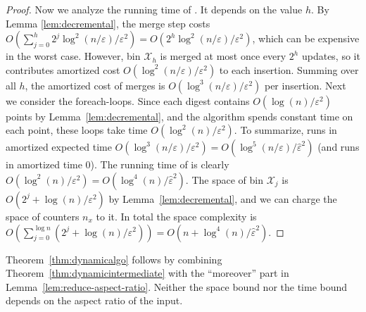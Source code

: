 \documentclass[11pt]{article}
\newcommand{\eps}{\varepsilon}
\newcommand{\class}[1]{\mathcal{#1}}
\begin{document}
\begin{proof}
%
    Now we analyze the running time of \ins. It depends on the value $h$. By Lemma \ref{lem:decremental}, the merge step costs $O \left( \sum_{j = 0}^h 2^j \log^2(n/\eps) / \eps^2 \right) = O \left( 2^h \log^2(n/\eps) / \eps^2 \right)$, which can be expensive in the worst case. However, bin $\class{X}_h$ is merged at most once every $2^h$ updates, so it contributes amortized cost $O(\log^2(n/\eps) / \eps^2)$ to each insertion. Summing over all $h$, the amortized cost of merges is $O(\log^3(n/\eps) / \eps^2)$ per insertion.
    Next we consider the foreach-loops. Since each digest contains $O(\log(n) / \eps^2)$ points by Lemma~\ref{lem:decremental}, and the algorithm spends constant time on each point, these loops take time $O(\log^2(n) / \eps^2)$.
    To summarize, \ins runs in amortized expected time $O(\log^3(n/\eps) / \eps^2) = O(\log^5(n/\eps) / \hat \eps^2)$ (and \del runs in amortized time 0).
%
    The running time of \est is clearly $O(\log^2(n) / \eps^2) = O(\log^4(n)/\hat \eps^2)$.
%
    The space of bin $\class{X}_j$ is $O(2^j + \log(n) / \eps^2)$ by Lemma~\ref{lem:decremental}, and we can charge the space of counters $n_x$ to it. In total the space complexity is $O\left( \sum_{j=0}^{\log n} (2^j + \log(n) / \eps^2) \right) = O(n + \log^4(n) / \hat \eps^2)$.
\end{proof}
%
Theorem~\ref{thm:dynamicalgo} follows by combining Theorem~\ref{thm:dynamicintermediate} with the ``moreover'' part in Lemma~\ref{lem:reduce-aspect-ratio}. Neither the space bound nor the time bound depends on the aspect ratio of the input.
%
\end{document}
